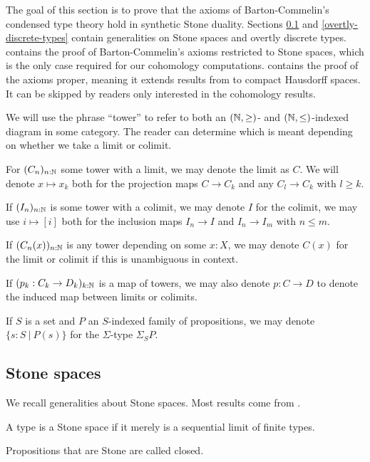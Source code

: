 The goal of this section is to prove that the axioms of Barton-Commelin's condensed type theory hold in synthetic Stone duality. Sections \ref{stone-spaces} and \ref{overtly-discrete-types} contain generalities on Stone spaces and overtly discrete types.  contains the proof of Barton-Commelin's axioms restricted to Stone spaces, which is the only case required for our cohomology computations.  contains the proof of the axioms proper, meaning it extends results from  to compact Hausdorff spaces. It can be skipped by readers only interested in the cohomology results.

\begin{remark}[On notation]
  \item We will use the phrase ``tower'' to refer to both an $(\mathbb{N} , \geq)$- and $(\mathbb{N}, \leq)$-indexed diagram in some category. The reader can determine which is meant depending on whether we take a limit or colimit. 
  \item For $(C_n)_{n:\mathbb{N}}$ some tower with a limit, we may denote the limit as $C$. We will denote $x\mapsto x_k$ both for the projection maps $C \to C_k$ and any $C_l \to C_k$ with $l\geq k$.
  \item 
  If $(I_n)_{n:\mathbb{N}}$ is some tower with a colimit, we may denote $I$ for the colimit, we may use $i\mapsto [i]$ both for the inclusion maps $I_n \to I$ and $I_n \to I_m$ with $n\leq m$. 
\item If $(C_n(x))_{n:\mathbb{N}}$ is any tower depending on some $x:X$, we may denote $C(x)$ for the limit or colimit if this is unambiguous in context. 
\item If $(p_k:C_k \to D_k)_{k:\mathbb{N}}$ is a map of towers, we may also denote $p:C \to D$ to denote the induced map between limits or colimits. 
\item If $S$ is a set and $P$ an $S$-indexed family of propositions, we may denote $\{s:S\ |\ P(s)\}$ for the $\Sigma$-type $\Sigma_SP$. 
\end{remark} 

\subsection{Stone spaces}
\label{stone-spaces}

We recall generalities about Stone spaces. Most results come from \cite{synthetic-stone-duality}. 

\begin{definition}
A type is a Stone space if it merely is a sequential limit of finite types.

Propositions that are Stone are called closed.
\end{definition}

